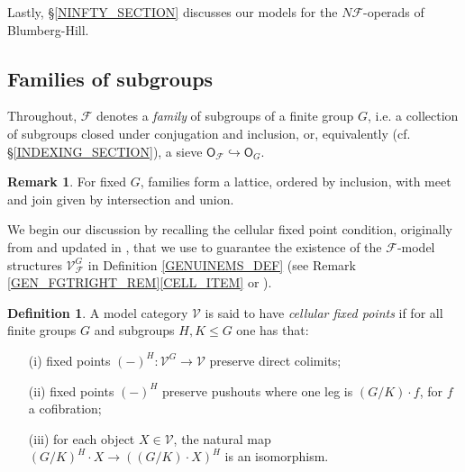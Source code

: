 \documentclass[a4paper,10pt
,draft
]{article}%
\numberwithin{equation}{section}
\numberwithin{figure}{section}
\theoremstyle{definition} %
\newtheorem{definition}[equation]{Definition}%
\newtheorem{remark}[equation]{Remark}%
\newcommand{\1}{\ensuremath{\mathbbm 1}}%
\begin{document}
Lastly, \S \ref{NINFTY_SECTION} discusses our models for the 
$N \mathcal{F}$-operads of Blumberg-Hill.

\subsection{Families of subgroups}
\label{FAMILY_SEC}

Throughout,
$\mathcal{F}$ denotes a \textit{family} of subgroups of a finite group $G$,
i.e. a collection of subgroups closed under conjugation and inclusion, or, equivalently
(cf. \S \ref{INDEXING_SECTION}),
a sieve 
$
\mathsf{O}_{\mathcal{F}}
	\hookrightarrow 
\mathsf{O}_G
$.

\begin{remark}
For fixed $G$, families form a lattice, ordered by inclusion, 
with meet and join given by intersection and union.
\end{remark}


We begin our discussion by recalling
the cellular fixed point condition,
originally from \cite{Gui06} and updated in \cite{Ste16},
that we use to guarantee the existence
of the $\mathcal{F}$-model structures
$\mathcal{V}^G_{\mathcal{F}}$
in Definition \ref{GENUINEMS_DEF}
(see Remark \ref{GEN_FGTRIGHT_REM}\ref{CELL_ITEM} or \cite[Prop. 2.6]{Ste16}).


\begin{definition}\label{CELL DEF}
	A model category $\mathcal{V}$ is said to have 
	\textit{cellular fixed points} if for all finite groups $G$ and subgroups $H,K\leq G$ one has that:
\begin{itemize}
	\item[(i)] fixed points $(\minus)^H \colon \mathcal{V}^G \to \mathcal{V}$ preserve direct colimits;
	\item[(ii)] fixed points $(\minus)^H$ preserve pushouts where one leg is $(G/K)\cdot f$, for $f$ a cofibration;
	\item[(iii)] for each object $X \in \mathcal{V}$, the natural map 
	$(G/K)^H \cdot X \to ((G/K) \cdot X)^H$
	is an isomorphism.
\end{itemize}
\end{definition}
\end{document}
